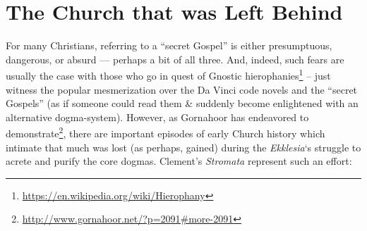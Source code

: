 \section{The Church that was Left Behind}

For many Christians, referring to a ``secret Gospel'' is either presumptuous, dangerous, or absurd --- perhaps a bit of all three. And, indeed, such fears are usually the case with those who go in quest of Gnostic hierophanies\footnote{\url{https://en.wikipedia.org/wiki/Hierophany}} -- just witness the popular mesmerization over the Da Vinci code novels and the ``secret Gospels'' (as if someone could read them \& suddenly become enlightened with an alternative dogma-system). However, as Gornahoor has endeavored to demonstrate\footnote{\url{http://www.gornahoor.net/?p=2091\#more-2091}}, there are important episodes of early Church history which intimate that much was lost (as perhaps, gained) during the \emph{Ekklesia}`s struggle to acrete and purify the core dogmas. Clement's \emph{Stromata} represent such an effort:

